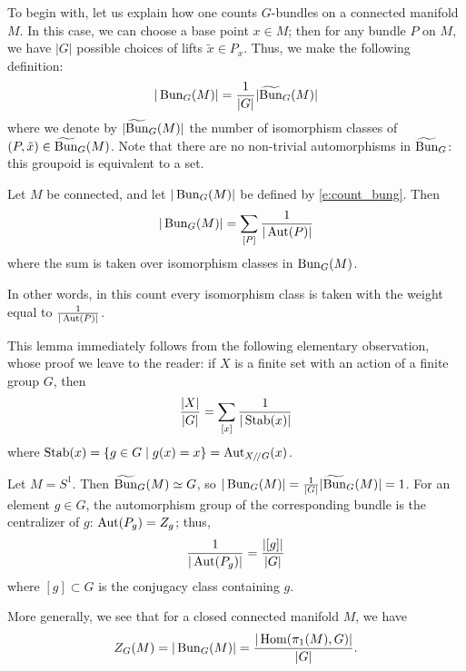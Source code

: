 To begin with, let us explain how one counts $G$-bundles on a connected
manifold $M$. In this case, we can choose a base point $x\in M$; then for any
bundle $P$ on $M$, we have $|G|$ possible choices of lifts $\tilde x\in P_x$.
Thus, we make the following definition:
\begin{equation}\label{e:count_bung}
  |\operatorname{Bun}_G(M)|=\frac{1}{|G|} |\widetilde{\operatorname{Bun}}_G(M)|
\end{equation}
where we denote by $|\widetilde{\operatorname{Bun}}_G(M)|$ the number of isomorphism classes of
$(P,\tilde x)\in \widetilde{\operatorname{Bun}}_G(M)$. Note that there are no non-trivial
automorphisms in $\widetilde{\operatorname{Bun}}_G$: this groupoid is equivalent to a set.

\begin{lemma}\label{l:count_aut}
  Let $M$ be connected, and let $|\operatorname{Bun}_G(M)|$ be defined by
  \eqref{e:count_bung}. Then
  $$
    |\operatorname{Bun}_G(M)|=\sum_{[P]} \frac{1}{|\operatorname{Aut}(P)|}
  $$
  where the sum is taken over isomorphism classes in $\operatorname{Bun}_G(M)$.
\end{lemma}
In other words, in this count every isomorphism class is taken with
the weight equal to $\frac{1}{|\operatorname{Aut}(P)|}$.

This lemma immediately follows from the following elementary observation,
whose proof we leave to the reader: if $X$ is a finite set with an action of a
finite group $G$, then
$$
  \frac{|X|}{|G|}=\sum_{[x]}\frac{1}{|\operatorname{Stab}(x)|}
$$
where $\operatorname{Stab}(x)=\{g\in G\; | \; g(x)=x\}=\operatorname{Aut}_{X/ \! / G}(x)$.
\begin{example}\label{x:bun-circle}
  Let $M=S^1$. Then $\widetilde{\operatorname{Bun}}_G(M)\simeq G$, so $|\operatorname{Bun}_G(M)|=\frac{1}{|G|}
  |\widetilde{\operatorname{Bun}}_G(M)|=1$.
  For an element $g\in G$, the automorphism group of the corresponding bundle
  is the centralizer of $g$: $\operatorname{Aut}(P_g)=Z_g$; thus,
  $$
  \frac{1}{|\operatorname{Aut}(P_g)|}= \frac{|[g]|}{|G|}
  $$
  where $[g]\subset G$ is the conjugacy class containing $g$.
\end{example}

More generally, we see that for a closed connected manifold $M$, we have
\begin{equation}\label{e:dw_closed}
  Z_G(M)= |\operatorname{Bun}_G(M)|= \frac{|\operatorname{Hom}(\pi_1(M), G)|}{|G|}.
\end{equation}


